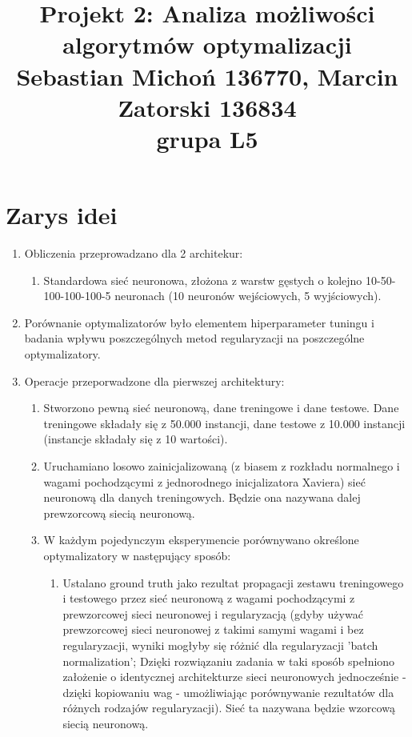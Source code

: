 \documentclass[12pt]{article}
\begin{document}
\title{Projekt 2: Analiza możliwości algorytmów optymalizacji\\
\large Sebastian Michoń 136770, Marcin Zatorski 136834\\
\large grupa L5}
\date{\vspace{-10ex}}
\maketitle

\section{Zarys idei}
\begin{enumerate}
	\item Obliczenia przeprowadzano dla 2 architekur:
	\begin{enumerate}
		\item Standardowa sieć neuronowa, złożona z warstw gęstych o kolejno 10-50-100-100-100-5 neuronach (10 neuronów wejściowych, 5 wyjściowych).
	\end{enumerate}
	\item Porównanie optymalizatorów było elementem hiperparameter tuningu i badania wpływu poszczególnych metod regularyzacji na poszczególne optymalizatory.
	\item Operacje przeporwadzone dla pierwszej architektury:
	\begin{enumerate}
		\item Stworzono pewną sieć neuronową, dane treningowe i dane testowe. Dane treningowe składały się z 50.000 instancji, dane testowe z 10.000 instancji (instancje składały się z 10 wartości).
		\item Uruchamiano losowo zainicjalizowaną (z biasem z rozkładu normalnego i wagami pochodzącymi z jednorodnego inicjalizatora Xaviera) sieć neuronową dla danych treningowych. Będzie ona nazywana dalej prewzorcową siecią neuronową.
		\item W każdym pojedynczym eksperymencie porównywano określone optymalizatory w następujący sposób:
		\begin{enumerate}
			\item Ustalano ground truth jako rezultat propagacji zestawu treningowego i testowego przez sieć neuronową z wagami pochodzącymi z prewzorcowej sieci neuronowej i regularyzacją (gdyby używać prewzorcowej sieci neuronowej z takimi samymi wagami i bez regularyzacji, wyniki mogłyby się różnić dla regularyzacji 'batch  normalization'; Dzięki rozwiązaniu zadania w taki sposób spełniono założenie o identycznej architekturze sieci neuronowych jednocześnie - dzięki kopiowaniu wag - umożliwiając porównywanie rezultatów dla różnych rodzajów regularyzacji). Sieć ta nazywana będzie wzorcową siecią neuronową.

\end{enumerate}
\end{enumerate}
\end{enumerate}
\end{document}
